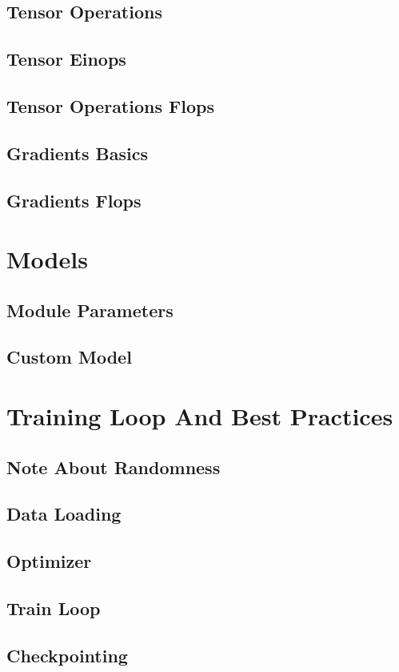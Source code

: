 \subsection{Tensor Operations}
\subsection{Tensor Einops}
\subsection{Tensor Operations Flops}
\subsection{Gradients Basics}
\subsection{Gradients Flops}


\clearpage
{\chaptoc\noindent\begin{minipage}[inner sep=0,outer sep=0]{0.9\linewidth}\section{Models}
\end{minipage}}
\subsection{Module Parameters}
\subsection{Custom Model}



\clearpage
{\chaptoc\noindent\begin{minipage}[inner sep=0,outer sep=0]{0.9\linewidth}\section{Training Loop And Best Practices}
\end{minipage}}
\subsection{Note About Randomness}
\subsection{Data Loading}
\subsection{Optimizer}
\subsection{Train Loop}
\subsection{Checkpointing}

\clearpage

